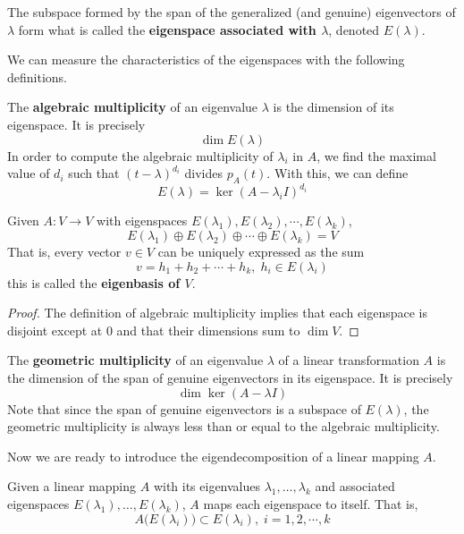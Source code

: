   \begin{definition}
    The subspace formed by the span of the generalized (and genuine) eigenvectors of $\lambda$ form what is called the \textbf{eigenspace associated with $\lambda$}, denoted $E(\lambda)$. 
  \end{definition}

  We can measure the characteristics of the eigenspaces with the following definitions. 

  \begin{definition}
    The \textbf{algebraic multiplicity} of an eigenvalue $\lambda$ is the dimension of its eigenspace. It is precisely
    \[\dim{E(\lambda)}\]  
    In order to compute the algebraic multiplicity of $\lambda_i$ in $A$, we find the maximal value of $d_i$ such that $(t-\lambda)^{d_i}$ divides $p_A (t)$. With this, we can define 
    \[E(\lambda) = \ker{(A - \lambda_i I)^{d_i}}\]
  \end{definition} 

  \begin{theorem}
    Given $A: V \longrightarrow V$ with eigenspaces $E(\lambda_1), E(\lambda_2), \cdots, E(\lambda_k)$, 
    \[E(\lambda_1) \oplus E(\lambda_2) \oplus \cdots \oplus E(\lambda_k) = V\]
    That is, every vector $v \in V$ can be uniquely expressed as the sum 
    \[ v = h_1 + h_2 + \cdots + h_k, \; h_i \in E(\lambda_i)\]
    this is called the \textbf{eigenbasis of $V$}. 
  \end{theorem}
  \begin{proof}
    The definition of algebraic multiplicity implies that each eigenspace is disjoint except at $0$ and that their dimensions sum to $\dim{V}$. 
  \end{proof}

  \begin{definition}
    The \textbf{geometric multiplicity} of an eigenvalue $\lambda$ of a linear transformation $A$ is the dimension of the span of genuine eigenvectors in its eigenspace. It is precisely 
    \[\dim{\ker{(A - \lambda I)}}\]
    Note that since the span of genuine eigenvectors is a subspace of $E(\lambda)$, the geometric multiplicity is always less than or equal to the algebraic multiplicity. 
  \end{definition}

  Now we are ready to introduce the eigendecomposition of a linear mapping $A$.

  \begin{theorem}
    Given a linear mapping $A$ with its eigenvalues $\lambda_1, \ldots, \lambda_k$ and associated eigenspaces $E(\lambda_1), \ldots, E(\lambda_k)$, $A$ maps each eigenspace to itself. That is, 
    \[A\big( E(\lambda_i) \big) \subset E(\lambda_i), \; i = 1, 2, \cdots, k\]
  \end{theorem}

